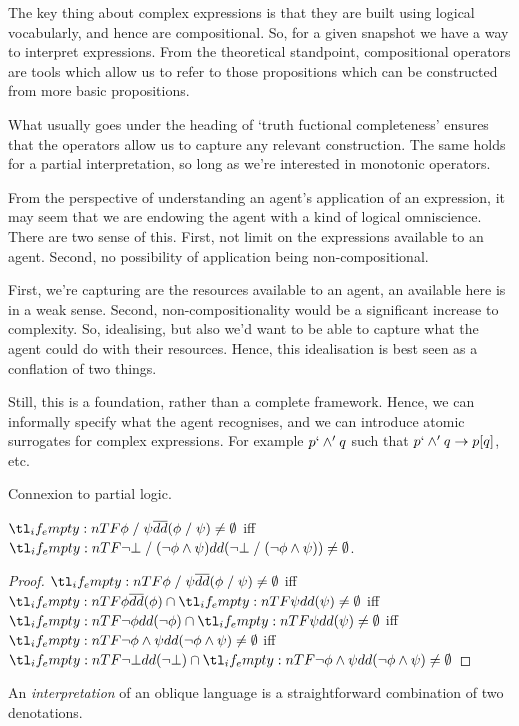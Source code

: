 \documentclass[10pt]{article}
\begin{document}
The key thing about complex expressions is that they are built using logical vocabularly, and hence are compositional.
So, for a given snapshot we have a way to interpret expressions.
From the theoretical standpoint, compositional operators are tools which allow us to refer to those propositions which can be constructed from more basic propositions.

What usually goes under the heading of `truth fuctional completeness' ensures that the operators allow us to capture any relevant construction.
The same holds for a partial interpretation, {\color{red} so long as we're interested in monotonic operators}.

From the perspective of understanding an agent's application of an expression, it may seem that we are endowing the agent with a kind of logical omniscience.
There are two sense of this.
First, not limit on the expressions available to an agent.
Second, no possibility of application being non-compositional.

First, we're capturing are the resources available to an agent, an available here is in a weak sense.
Second, non-compositionality would be a significant increase to complexity.
So, idealising, but also we'd want to be able to capture what the agent could do with their resources.
Hence, this idealisation is best seen as a conflation of two things.

Still, this is a foundation, rather than a complete framework.
Hence, we can informally specify what the agent recognises, and we can introduce atomic surrogates for complex expressions.
For example \(p `\land' q\) such that \(p `\land' q \rightarrow p[q]\), etc. 


Connexion to partial logic.

\begin{fact}
  \(\ideno{\phi \ltrans \psi} \ne \emptyset\) iff \(\cdeno{\lnot\bot \ltrans (\lnot\phi \land \psi)} \ne \emptyset\).
  \begin{proof}
    \(\ideno{\phi \ltrans \psi} \ne \emptyset\) iff \(\ideno{\phi} \cap \cdeno{\psi} \ne \emptyset\) iff \(\cdeno{\lnot\phi} \cap \cdeno{\psi} \ne \emptyset\) iff \(\cdeno{\lnot\phi \land \psi} \ne \emptyset\) iff \(\cdeno{\lnot\bot} \cap \cdeno{\lnot\phi \land \psi} \ne \emptyset\)
  \end{proof}
\end{fact}

An \emph{interpretation} of an oblique language is a straightforward combination of two denotations.
\end{document}
